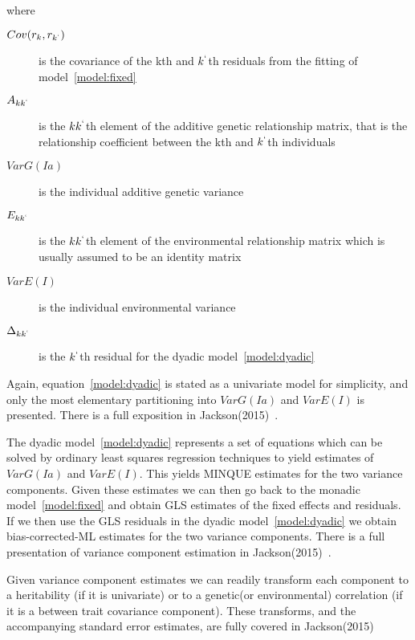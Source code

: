 \documentclass[titlepage]{article}  %
\begin{document}
where
\begin{description}
\item[$Cov(r_{k},r_{k^{`}})$] is the covariance of the kth and $k^{`}$th residuals from the fitting of model~\ref{model:fixed}
\item[$A_{kk^{`}}$] is the $kk^{`}$th element of the additive genetic relationship matrix, that is the relationship coefficient between the kth and $k^{`}$th individuals
\item[$VarG(Ia)$] is the individual additive genetic variance
\item[$E_{kk^{`}}$] is the $kk^{`}$th element of the environmental relationship matrix which is usually assumed to be an identity matrix
\item[$VarE(I)$] is the individual environmental variance
\item[$\Delta_{kk^{`}}$] is the $k^{`}$th residual for the dyadic model~\ref{model:dyadic}
\end{description}

Again, equation~\ref{model:dyadic} is stated as a univariate model for simplicity, and only the most elementary partitioning into $VarG(Ia)$ and $VarE(I)$ is presented. There is a full exposition in Jackson(2015)~\cite{jack:15b}. 

 The dyadic model~\ref{model:dyadic} represents a set of equations which can be solved by ordinary least squares regression techniques to yield estimates of $VarG(Ia)$  and $VarE(I)$. This yields MINQUE estimates for the two variance components. Given these estimates we can then go back to the monadic model~\ref{model:fixed} and obtain GLS estimates of the fixed effects and residuals. If we then use the GLS residuals in the dyadic model~\ref{model:dyadic} we obtain bias-corrected-ML estimates for the two variance components. There is a full presentation of variance component estimation in Jackson(2015)~\cite{jack:15b}.

Given variance component estimates we can readily transform each component to a heritability (if it is univariate) or to a genetic(or environmental) correlation (if it is a between trait covariance component). These transforms, and the accompanying standard error estimates, are fully covered in Jackson(2015)~\cite{jack:15b}
\end{document}
